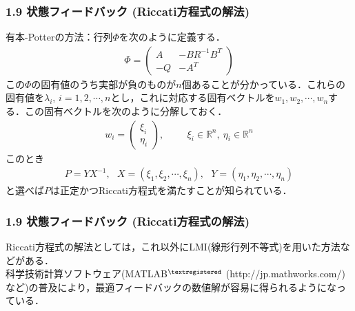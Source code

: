 \begin{frame}[t]
\frametitle{1.9 状態フィードバック (Riccati方程式の解法)}

有本-Potterの方法：行列$\Phi$を次のように定義する．
\begin{align}
 \Phi = \left(\begin{array}{cc}
	       A  & - B R^{-1} B^T \\
	       -Q & - A^T
	      \end{array}\right)
\end{align}
この$\Phi$の固有値のうち実部が負のものが$n$個あることが分かっている．これらの固有値を$\lambda_i$, $i=1,2,\cdots,n$とし，これに対応する固有ベクトルを$w_1, w_2, \cdots, w_n$する．この固有ベクトルを次のように分解しておく．
\begin{align}
 w_i = \left(\begin{array}{c}
	      \xi_i \\
	      \eta_i
	     \end{array}\right), \hspace{1cm} \xi_i \in {\mathbb R}^n, \ \eta_i \in {\mathbb R}^n
\end{align}
このとき
\begin{align}
	P = Y X^{-1}, \ \ \ 
	X = (\xi_1, \xi_2, \cdots, \xi_n), \ \ \ 
	Y = (\eta_1, \eta_2, \cdots, \eta_n)
\end{align}
と選べば$P$は正定かつRiccati方程式を満たすことが知られている．

\end{frame}



\begin{frame}[t]
\frametitle{1.9 状態フィードバック (Riccati方程式の解法)}
Riccati方程式の解法としては，これ以外にLMI(線形行列不等式)を用いた方法などがある．
\\[2cm]

科学技術計算ソフトウェア(MATLAB$^{\tiny \textregistered}$ (http://jp.mathworks.com/)など)の普及により，最適フィードバックの数値解が容易に得られるようになっている．

\end{frame}

